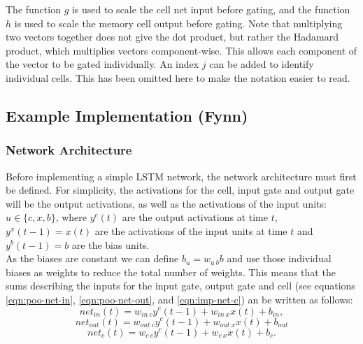 \documentclass[twoside,a4paper,10pt,DIV=12,BCOR=12mm]{scrartcl}
\begin{document}
The function \begin{math}g\end{math} is used to scale the cell net input before gating, and the function \begin{math}h\end{math} is used to scale the memory cell output before gating.
Note that multiplying two vectors together does not give the dot product, but rather the Hadamard product, which multiplies vectors component-wise.\cite{gokmen2018hadamard} This allows each component of the vector to be gated individually.
An index \begin{math}j\end{math} can be added to identify individual cells. This has been omitted here to make the notation easier to read.\cite{hochreiter1997lstm}

\subsection{Example Implementation (Fynn)}
\subsubsection{Network Architecture}
Before implementing a simple LSTM network, the network architecture must first be defined.
For simplicity, the activations for the cell, input gate and output gate will be the output activations, as well as the activations of the input units:   \begin{math}u\in\{c, x, b \}\end{math}, where \begin{math}y^c(t)\end{math} are the output activations at time \begin{math}t\end{math}, \begin{math}y^x(t-1)=x(t)\end{math} are the activations of the input units at time \begin{math}t\end{math} and \begin{math}y^b(t-1)=b\end{math} are the bias units.\\\cite{hochreiter1997lstm} 
As the biases are constant we can define \begin{math}b_u=w_{u\ b}b\end{math} and use those individual biases as weights to reduce the total number of weights.
This means that the sums describing the inputs for the input gate, output gate and cell  (see equations \ref{eqn:poo-net-in}, \ref{eqn:poo-net-out}, and \ref{eqn:imp-net-c})  an be written as follows:
\begin{equation}
\label{eqn:imp-net-in}
net_{in}(t)=w_{in\ c}y^c(t-1)+w_{in\ x}x(t)+b_{in},
\end{equation}
\begin{equation}
\label{eqn:imp-net-out}
net_{out}(t)=w_{out\ c}y^c(t-1)+w_{out\ x}x(t)+b_{out}
\end{equation}
\begin{equation}
\label{eqn:imp-net-c}
net_c(t)=w_{c\ c}y^c(t-1)+w_{c\ x}x(t)+b_c.
\end{equation}
\end{document}
